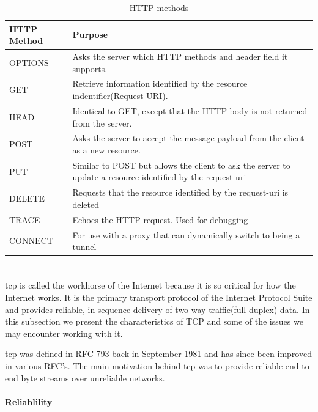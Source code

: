  \begin{table}[h]
 \begin{tabularx}{\textwidth}{| X | X |}
 \hline
   \textbf{HTTP Method} & \textbf{Purpose} \\ \hline
   OPTIONS & Asks the server which HTTP methods and header field it supports. \\ \hline
   GET & Retrieve information identified by the resource indentifier(Request-URI). \\ \hline
   HEAD & Identical to GET, except that the HTTP-body is not returned from the server. \\ \hline
   POST & Asks the server to accept the message payload from the client as a new resource.\\ \hline
   PUT & Similar to POST but allows the client to ask the server to update a resource identified by the request-uri \\ \hline
   DELETE & Requests that the resource identified by the request-uri is deleted \\ \hline
   TRACE & Echoes the HTTP request. Used for debugging \\ \hline
   CONNECT & For use with a proxy that can dynamically switch to being a tunnel\\ \hline
 \end{tabularx}
 \caption{HTTP methods}
 \label{table-http-methods}
 \end{table}

\section{}
\label{tcp}

\gls{tcp} is called the workhorse of the Internet because it is so critical for
how the Internet works. It is the primary transport protocol of the Internet
Protocol Suite\cite{rfc-1122} and provides reliable, in-sequence delivery of
two-way traffic(full-duplex) data.  In this subsection we present the
characteristics of TCP and some of the issues we may encounter working with it.

\gls{tcp} was defined in RFC 793\cite{rfc-793} back in September 1981 and has
since been improved in various RFC's. The main motivation behind \gls{tcp} was
to provide reliable end-to-end byte streams over unreliable networks.

\paragraph{Reliablility}

